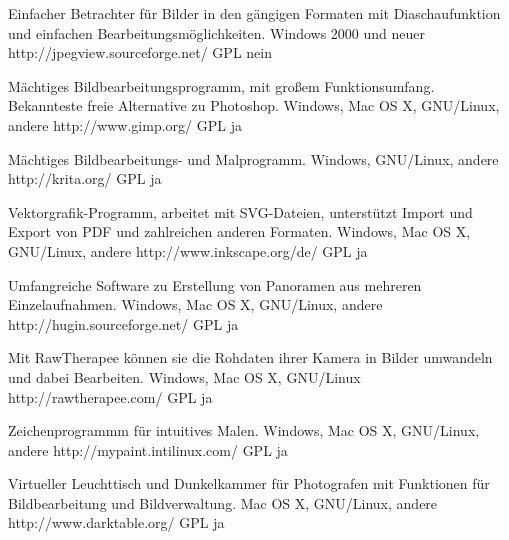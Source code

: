 \documentclass[11pt,a4paper,landscape,twocolumn]{article}
\begin{document}

{Einfacher Betrachter für Bilder in den gängigen Formaten mit Diaschaufunktion und einfachen Bearbeitungsmöglichkeiten.}
{Windows 2000 und neuer}
{http://jpegview.sourceforge.net/}
{GPL}
{nein}

{Mächtiges Bildbearbeitungsprogramm, mit großem Funktionsumfang. Bekannteste freie Alternative zu Photoshop.}
{Windows, Mac OS X, GNU/Linux, andere}
{http://www.gimp.org/}
{GPL}
{ja}

{Mächtiges Bildbearbeitungs- und Malprogramm.}
{Windows, GNU/Linux, andere}
{http://krita.org/}
{GPL}
{ja}

{Vektorgrafik-Programm, arbeitet mit SVG-Dateien, unterstützt Import und Export von PDF und zahlreichen anderen Formaten.}
{Windows, Mac OS X, GNU/Linux, andere}
{http://www.inkscape.org/de/}
{GPL}
{ja}

\newpage %

{Umfangreiche Software zu Erstellung von Panoramen aus mehreren Einzelaufnahmen.}
{Windows, Mac OS X, GNU/Linux, andere}
{http://hugin.sourceforge.net/}
{GPL}
{ja}

{Mit RawTherapee können sie die Rohdaten ihrer Kamera in Bilder umwandeln und dabei Bearbeiten.}
{Windows, Mac OS X, GNU/Linux}
{http://rawtherapee.com/ }
{GPL}
{ja}

{Zeichenprogrammm für intuitives Malen.}
{Windows, Mac OS X, GNU/Linux, andere}
{http://mypaint.intilinux.com/}
{GPL}
{ja}

{Virtueller Leuchttisch und Dunkelkammer für Photografen mit Funktionen für Bildbearbeitung und Bildverwaltung.}
{Mac OS X, GNU/Linux, andere}
{http://www.darktable.org/}
{GPL}
{ja}
\end{document}
